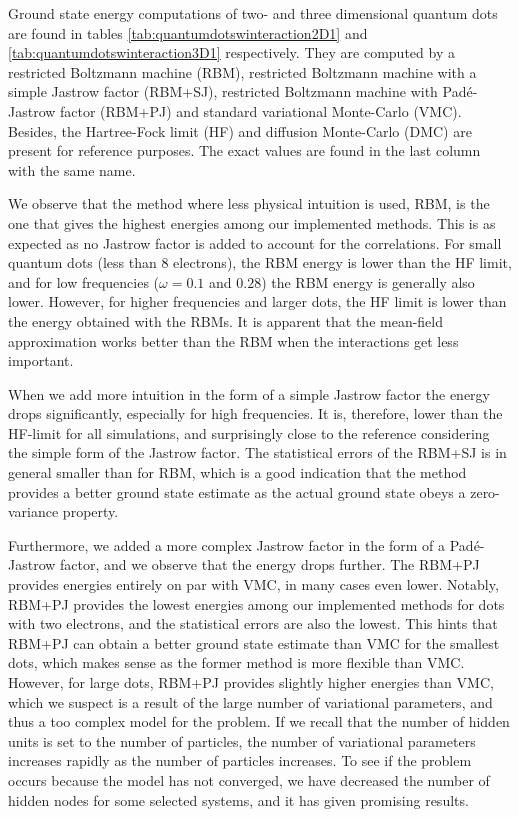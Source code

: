 Ground state energy computations of two- and three dimensional quantum dots are found in tables \eqref{tab:quantumdotswinteraction2D1} and \eqref{tab:quantumdotswinteraction3D1} respectively. They are computed by a restricted Boltzmann machine (RBM), restricted Boltzmann machine with a simple Jastrow factor (RBM+SJ), restricted Boltzmann machine with Padé-Jastrow factor (RBM+PJ) and standard variational Monte-Carlo (VMC). Besides, the Hartree-Fock limit (HF) and diffusion Monte-Carlo (DMC) are present for reference purposes. The exact values are found in the last column with the same name. 

We observe that the method where less physical intuition is used, RBM, is the one that gives the highest energies among our implemented methods. This is as expected as no Jastrow factor is added to account for the correlations. For small quantum dots (less than 8 electrons), the RBM energy is lower than the HF limit, and for low frequencies ($\omega=0.1$ and $0.28$) the RBM energy is generally also lower. However, for higher frequencies and larger dots, the HF limit is lower than the energy obtained with the RBMs. It is apparent that the mean-field approximation works better than the RBM when the interactions get less important. 

When we add more intuition in the form of a simple Jastrow factor the energy drops significantly, especially for high frequencies. It is, therefore, lower than the HF-limit for all simulations, and surprisingly close to the reference considering the simple form of the Jastrow factor. The statistical errors of the RBM+SJ is in general smaller than for RBM, which is a good indication that the method provides a better ground state estimate as the actual ground state obeys a zero-variance property. 

Furthermore, we added a more complex Jastrow factor in the form of a Padé-Jastrow factor, and we observe that the energy drops further. The RBM+PJ provides energies entirely on par with VMC, in many cases even lower. Notably, RBM+PJ provides the lowest energies among our implemented methods for dots with two electrons, and the statistical errors are also the lowest. This hints that RBM+PJ can obtain a better ground state estimate than VMC for the smallest dots, which makes sense as the former method is more flexible than VMC. However, for large dots, RBM+PJ provides slightly higher energies than VMC, which we suspect is a result of the large number of variational parameters, and thus a too complex model for the problem. If we recall that the number of hidden units is set to the number of particles, the number of variational parameters increases rapidly as the number of particles increases. To see if the problem occurs because the model has not converged, we have decreased the number of hidden nodes for some selected systems, and it has given promising results.


